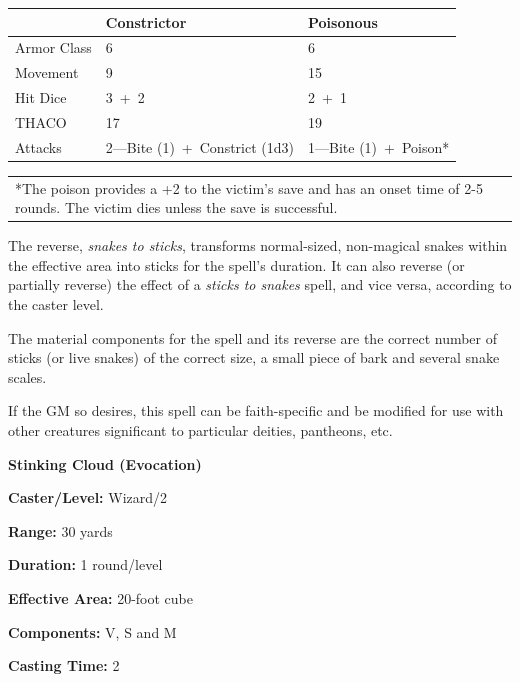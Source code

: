 \begin{multicols}{2}
\noindent
\begin{tabular}{|p{}|p{}|p{}|}
\hline
	& Constrictor	& Poisonous \\
\hline\hline
\rowcolor[gray]{.9}Armor Class	& 6	& 6 \\
Movement	& 9	& 15 \\
\rowcolor[gray]{.9}Hit Dice	& 3~+~2	& 2~+~1 \\
THACO	& 17	& 19 \\
\rowcolor[gray]{.9}Attacks	& 2---Bite (1)~+~Constrict (1d3)	& 1---Bite (1)~+~Poison* \\
\hline
\end{tabular}
\noindent\begin{tabular}{p{}}
*The poison provides a +2 to the victim's save and has an onset time of 2-5 rounds.  The victim dies unless the save is successful. \\
\end{tabular}\vspace{.5em}

The reverse, \textit{snakes to sticks}, transforms normal-sized, non-magical snakes within the effective area into sticks for the spell's duration. It can also reverse (or partially reverse) the effect of a \textit{sticks to snakes} spell, and vice versa, according to the caster level.

The material components for the spell and its reverse are the correct number of sticks (or live snakes) of the correct size, a small piece of bark and several snake scales.  

If the GM so desires, this spell can be faith-specific and be modified for use with other creatures significant to particular deities, pantheons, etc.

\vspace{1em}

\noindent
\begin{minipage}{\columnwidth}

\noindent \textbf{Stinking Cloud (Evocation)}

\noindent \textbf{Caster/Level:} Wizard/2

\noindent \textbf{Range:} 30 yards

\noindent \textbf{Duration:} 1 round/level

\noindent \textbf{Effective Area:} 20-foot cube

\noindent \textbf{Components:} V, S and M

\noindent \textbf{Casting Time:} 2


\end{minipage}
\end{multicols}
